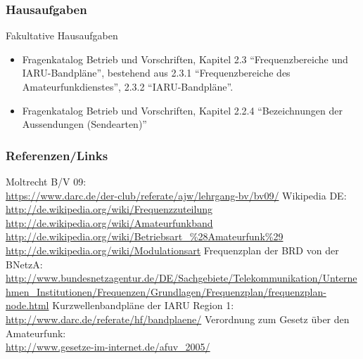 \begin{frame}
  \frametitle{Hausaufgaben}

  \begin{alertblock}{Fakultative Hausaufgaben}
    \begin{itemize}
      \item Fragenkatalog Betrieb und Vorschriften, Kapitel 2.3 ``Frequenzbereiche und IARU-Bandpläne'', bestehend aus 2.3.1 ``Frequenzbereiche des Amateurfunkdienstes'', 2.3.2 ``IARU-Bandpläne''.
      \item Fragenkatalog Betrieb und Vorschriften, Kapitel 2.2.4 ``Bezeichnungen der Aussendungen (Sendearten)''
    \end{itemize}
  \end{alertblock}
\end{frame}

\renewcommand{\refname}{Referenzen}

\begin{frame}
  \frametitle{Referenzen/Links}
  \hypertarget{refs}{}
  \footnotesize

  \begin{thebibliography}{}
     Moltrecht B/V 09: \\
      \url{https://www.darc.de/der-club/referate/ajw/lehrgang-bv/bv09/}
        Wikipedia DE: \\
      \url{http://de.wikipedia.org/wiki/Frequenzzuteilung} \\
      \url{http://de.wikipedia.org/wiki/Amateurfunkband} \\
      \url{http://de.wikipedia.org/wiki/Betriebsart_\%28Amateurfunk\%29} \\
      \url{http://de.wikipedia.org/wiki/Modulationsart}
      Frequenzplan der BRD von der BNetzA: \\
      \url{http://www.bundesnetzagentur.de/DE/Sachgebiete/Telekommunikation/Unternehmen_Institutionen/Frequenzen/Grundlagen/Frequenzplan/frequenzplan-node.html}
      Kurzwellenbandpläne der IARU Region 1: \\
      \url{http://www.darc.de/referate/hf/bandplaene/}
      Verordnung zum Gesetz über den Amateurfunk: \\
      \url{http://www.gesetze-im-internet.de/afuv_2005/}
  \end{thebibliography}

\end{frame}



